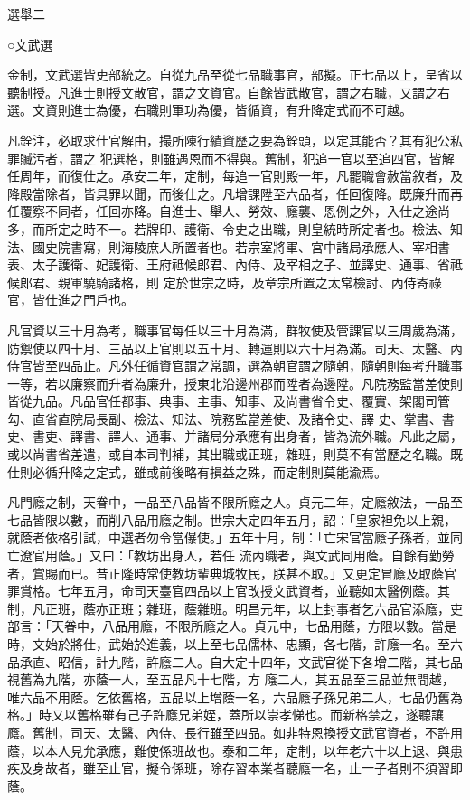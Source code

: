 
\begin{pinyinscope}

 選舉二



 ○文武選



 金制，文武選皆吏部統之。自從九品至從七品職事官，部擬。正七品以上，呈省以聽制授。凡進士則授文散官，謂之文資官。自餘皆武散官，謂之右職，又謂之右選。文資則進士為優，右職則軍功為優，皆循資，有升降定式而不可越。



 凡銓注，必取求仕官解由，撮所陳行績資歷之要為銓頭，以定其能否？其有犯公私罪贓污者，謂之
 犯選格，則雖遇恩而不得與。舊制，犯追一官以至追四官，皆解任周年，而復仕之。承安二年，定制，每追一官則殿一年，凡罷職會赦當敘者，及降殿當除者，皆具罪以聞，而後仕之。凡增課陞至六品者，任回復降。既廉升而再任覆察不同者，任回亦降。自進士、舉人、勞效、廕襲、恩例之外，入仕之途尚多，而所定之時不一。若牌印、護衛、令史之出職，則皇統時所定者也。檢法、知法、國史院書寫，則海陵庶人所置者也。若宗室將軍、宮中諸局承應人、宰相書表、太子護衛、妃護衛、王府祗候郎君、內侍、及宰相之子、並譯史、通事、省祗候郎君、親軍驍騎諸格，則
 定於世宗之時，及章宗所置之太常檢討、內侍寄祿官，皆仕進之門戶也。



 凡官資以三十月為考，職事官每任以三十月為滿，群牧使及管課官以三周歲為滿，防禦使以四十月、三品以上官則以五十月、轉運則以六十月為滿。司天、太醫、內侍官皆至四品止。凡外任循資官謂之常調，選為朝官謂之隨朝，隨朝則每考升職事一等，若以廉察而升者為廉升，授東北沿邊州郡而陞者為邊陞。凡院務監當差使則皆從九品。凡品官任都事、典事、主事、知事、及尚書省令史、覆實、架閣司管勾、直省直院局長副、檢法、知法、院務監當差使、及諸令史、譯
 史、掌書、書史、書吏、譯書、譯人、通事、并諸局分承應有出身者，皆為流外職。凡此之屬，或以尚書省差遣，或自本司判補，其出職或正班，雜班，則莫不有當歷之名職。既仕則必循升降之定式，雖或前後略有損益之殊，而定制則莫能渝焉。



 凡門廕之制，天眷中，一品至八品皆不限所廕之人。貞元二年，定廕敘法，一品至七品皆限以數，而削八品用廕之制。世宗大定四年五月，詔：「皇家袒免以上親，就蔭者依格引試，中選者勿令當儤使。」五年十月，制：「亡宋官當廕子孫者，並同亡遼官用蔭。」又曰：「教坊出身人，若任
 流內職者，與文武同用蔭。自餘有勤勞者，賞賜而已。昔正隆時常使教坊輩典城牧民，朕甚不取。」又更定冒廕及取蔭官罪賞格。七年五月，命司天臺官四品以上官改授文武資者，並聽如太醫例蔭。其制，凡正班，蔭亦正班；雜班，蔭雜班。明昌元年，以上封事者乞六品官添廕，吏部言：「天眷中，八品用廕，不限所廕之人。貞元中，七品用蔭，方限以數。當是時，文始於將仕，武始於進義，以上至七品儒林、忠顯，各七階，許廕一名。至六品承直、昭信，計九階，許廕二人。自大定十四年，文武官從下各增二階，其七品視舊為九階，亦蔭一人，至五品凡十七階，方
 廕二人，其五品至三品並無間越，唯六品不用蔭。乞依舊格，五品以上增蔭一名，六品廕子孫兄弟二人，七品仍舊為格。」時又以舊格雖有己子許廕兄弟姪，蓋所以崇孝悌也。而新格禁之，遂聽讓廕。舊制，司天、太醫、內侍、長行雖至四品。如非特恩換授文武官資者，不許用蔭，以本人見允承應，難使係班故也。泰和二年，定制，以年老六十以上退、與患疾及身故者，雖至止官，擬令係班，除存習本業者聽廕一名，止一子者則不須習即蔭。




\end{pinyinscope}
